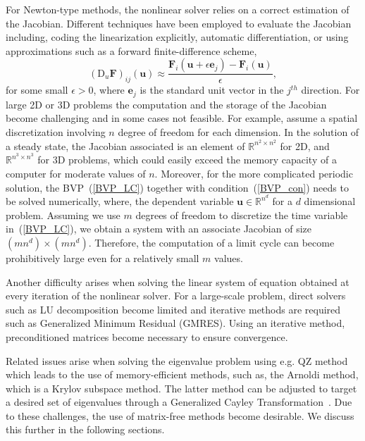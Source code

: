 For Newton-type methods, the nonlinear solver relies on a correct estimation of the Jacobian. Different techniques have been employed to evaluate the Jacobian including, coding the linearization explicitly, automatic differentiation, or using approximations such as a forward finite-difference scheme,
\begin{equation}
\left(\textrm{D}_u\mathbf{F}\right)_{ij}(\mathbf{u}) \approx \frac{\mathbf{F}_i(\mathbf{u}+\epsilon\mathbf{e}_j)-\mathbf{F}_i(\mathbf{u})}{\epsilon},
\end{equation}
for some small $\epsilon > 0$, where $\mathbf{e}_j$ is the standard unit vector in the $j^{th}$ direction.
For large 2D or 3D problems the computation and the storage of the Jacobian become challenging and in some cases not feasible. For example, assume a spatial discretization involving  $n$ degree of freedom for each dimension. In the solution of a steady state, the Jacobian associated is an element of $\mathbb{R}^{n^2\times n^2}$ for 2D, and $\mathbb{R}^{n^3\times n^3}$ for 3D problems, which could easily exceed the memory capacity of a computer for moderate values of $n$. Moreover, for the more complicated periodic solution, the BVP~(\ref{BVP_LC}) together with condition~(\ref{BVP_con}) needs to be solved numerically, where, the dependent variable $\mathbf{u} \in \mathbb{R}^{n^d}$ for a $d$ dimensional problem. Assuming we use $m$ degrees of freedom to discretize the time variable in~(\ref{BVP_LC}), we obtain a system with an associate Jacobian of size $(mn^{d})\times(mn^{d})$. Therefore, the computation of a limit cycle can become prohibitively large even for a relatively small $m$ values.

Another difficulty arises when solving the linear system of equation obtained at every iteration of the nonlinear solver.
For a large-scale problem, direct solvers such as LU decomposition become limited and iterative methods are required such as Generalized Minimum Residual (GMRES). Using an iterative method,  preconditioned matrices become necessary to ensure convergence.

Related issues arise when solving the eigenvalue problem using e.g. QZ method which leads to the use of memory-efficient methods, such as, the Arnoldi method, which is a Krylov subspace method. The latter method can be adjusted to target a desired set of eigenvalues through a Generalized Cayley Transformation~\cite{Caley}.
Due to these challenges, the use of matrix-free methods become desirable. We discuss this further in the following sections.

